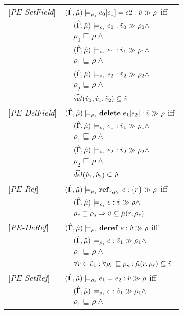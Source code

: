\begin{tabular} {l l l l}
{[\textit{PE-SetField}]}&\multicolumn{3}{l}{$(\hat{\Gamma},\hat{\mu}) \models_{\rho_s} e_0[e_1] = e2 : \hat{v} \gg \rho $ iff}\\
&&\multicolumn{2}{l}{$ (\hat{\Gamma},\hat{\mu}) \models_{\rho_s} e_0 : \hat{v}_{0} \gg \rho_{0} \wedge $}\\
&&\multicolumn{2}{l}{$\rho_0 \sqsubseteq \rho \wedge$} \\
&&\multicolumn{2}{l}{$ (\hat{\Gamma},\hat{\mu}) \models_{\rho_s} e_1 : \hat{v}_{1} \gg \rho_{1} \wedge $} \\
&&\multicolumn{2}{l}{$\rho_1 \sqsubseteq \rho \wedge$} \\
&&\multicolumn{2}{l}{$ (\hat{\Gamma},\hat{\mu}) \models_{\rho_s} e_2 : \hat{v}_{2} \gg \rho_{2} \wedge $} \\
&&\multicolumn{2}{l}{$\rho_2 \sqsubseteq \rho \wedge$} \\
&&\multicolumn{2}{l}{$\widehat{set} (\hat{v}_0, \hat{v}_1, \hat{v}_2) \subseteq \hat{v}$} \\
{[\textit{PE-DelField}]}&\multicolumn{3}{l}{$(\hat{\Gamma},\hat{\mu}) \models_{\rho_s} \mathbf{delete}\ e_1[e_2] : \hat{v} \gg \rho $ iff}\\
&&\multicolumn{2}{l}{$ (\hat{\Gamma},\hat{\mu}) \models_{\rho_s} e_1 : \hat{v}_{1} \gg \rho_{1} \wedge$}\\
&&\multicolumn{2}{l}{$\rho_1 \sqsubseteq \rho \wedge$} \\
&&\multicolumn{2}{l}{$ (\hat{\Gamma},\hat{\mu}) \models_{\rho_s} e_2 : \hat{v}_{2} \gg \rho_{2} \wedge $} \\
&&\multicolumn{2}{l}{$\rho_2 \sqsubseteq \rho \wedge$} \\
&&\multicolumn{2}{l}{$\widehat{del} (\hat{v}_1, \hat{v}_2) \subseteq \hat{v}$}\\
{[\textit{PE-Ref}]}&\multicolumn{3}{l}{$ (\hat{\Gamma},\hat{\mu}) \models_{\rho_s} \mathbf{ref}_{r,\rho_r}\ e :\{r\} \gg \rho $ iff}\\
&&\multicolumn{2}{l}{$ (\hat{\Gamma},\hat{\mu}) \models_{\rho_s} e : \hat{v} \gg \rho \wedge $}\\
&&\multicolumn{2}{l}{$\rho_r \sqsubseteq \rho_s \Rightarrow \hat{v} \subseteq \hat{\mu}(r, \rho_r) $} \\
{[\textit{PE-DeRef}]}&\multicolumn{3}{l}{$(\hat{\Gamma},\hat{\mu}) \models_{\rho_s} \mathbf{deref}\ e : \hat{v} \gg \rho $ iff}\\
&&\multicolumn{2}{l}{$(\hat{\Gamma},\hat{\mu}) \models_{\rho_s} e : \hat{v}_{1} \gg \rho_{1} \wedge $}\\
&&\multicolumn{2}{l}{$\rho_1 \sqsubseteq \rho \wedge$ }\\
&&\multicolumn{2}{l}{$\forall r \in \hat{v}_1 : \forall \rho_r \sqsubseteq \rho_s : \hat{\mu}(r, \rho_r) \subseteq \hat{v}$ }\\
{[\textit{PE-SetRef}]}&\multicolumn{3}{l}{$(\hat{\Gamma},\hat{\mu}) \models_{\rho_s} e_1 = e_2 : \hat{v} \gg \rho $ iff}\\
&&\multicolumn{2}{l}{$ (\hat{\Gamma},\hat{\mu}) \models_{\rho_s} e : \hat{v}_{1} \gg \rho_{1} \wedge $}\\
&&\multicolumn{2}{l}{$\rho_1 \sqsubseteq \rho \wedge$} \\

\end{tabular}
